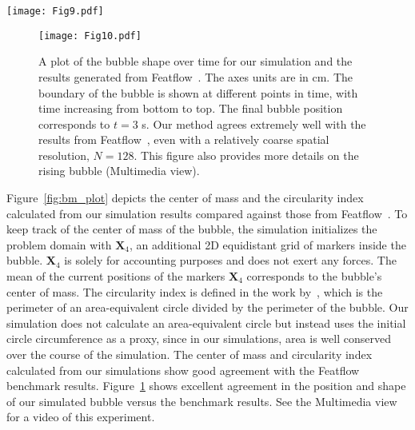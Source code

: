 \documentclass[%
 aip,
 amsmath,amssymb,
 reprint,
 floatfix
]{revtex4-1}
\begin{document}
\begin{figure*}
\centering
\texttt{[image: Fig9.pdf]}
\caption{\footnotesize{A comparison of our simulation results against those computed from Featflow~\cite{turek2021numerical}. The model is of a rising gas bubble in a liquid column. (a) and (b) show the altitude evolution of the center of mass and the circularity index of the bubble respectively, for our simulation (IB) and Featflow. (c) and (d) show the absolute error of the IB and Featflow results corresponding to (a) and (b), respectively.}}
\label{fig:bm_plot}
\end{figure*}
\begin{figure}
\centering
\texttt{[image: Fig10.pdf]}
\caption{\footnotesize{A plot of the bubble shape over time for our simulation and the results generated from Featflow~\cite{turek2021numerical}. The axes units are in cm. The boundary of the bubble is shown at different points in time, with time increasing from bottom to top. The final bubble position corresponds to $t = 3$ s. Our method agrees extremely well with the results from Featflow~\cite{turek2021numerical}, even with a relatively coarse spatial resolution, $N=128$. This figure also provides more details on the rising bubble (Multimedia view).%
}}
\label{fig:bm_shape}
\end{figure}

Figure~\ref{fig:bm_plot} depicts the center of mass and the circularity index calculated from our simulation results compared against those from Featflow~\cite{turek2021numerical}. To keep track of the center of mass of the bubble, the simulation initializes the problem domain with $\bm{X}_4$, an additional 2D equidistant grid of markers inside the bubble. $\bm{X}_4$ is solely for accounting purposes and does not exert any forces. The mean of the current positions of the markers $\bm{X}_4$ corresponds to the bubble's center of mass. The circularity index is defined in the work by~\citet{turek2021numerical}, which is the perimeter of an area-equivalent circle divided by the perimeter of the bubble. Our simulation does not calculate an area-equivalent circle but instead uses the initial circle circumference as a proxy, since in our simulations, area is well conserved over the course of the simulation. The center of mass and circularity index calculated from our simulations show good agreement with the Featflow benchmark results. Figure~\ref{fig:bm_shape} shows excellent agreement in the position and shape of our simulated bubble versus the benchmark results. See the Multimedia view for a video of this experiment.
\end{document}
